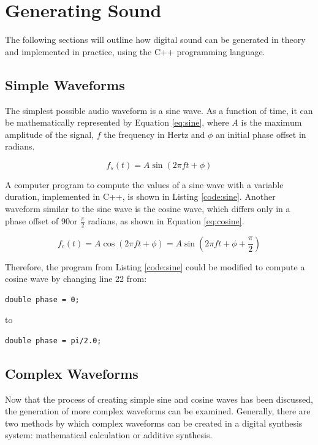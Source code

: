 \chapter{Generating Sound}

The following sections will outline how digital sound can be generated in theory and implemented in practice, using the C++ programming language.

\section{Simple Waveforms}

The simplest possible audio waveform is a sine wave. As a function of time, it can be mathematically represented by Equation \ref{eq:sine}, where $A$ is the maximum amplitude of the signal, $f$ the frequency in Hertz and $\phi$ an initial phase offset in radians.

\begin{equation}
f_{s}(t) = A \sin(2 \pi  f t + \phi)
\label{eq:sine}
\end{equation}

\noindent A computer program to compute the values of a sine wave with a variable duration, implemented in C++, is shown in Listing \ref{code:sine}. Another waveform similar to the sine wave is the cosine wave, which differs only in a phase offset of 90\degree or $\frac{\pi}{2}$ radians, as shown in Equation \ref{eq:cosine}.

\begin{equation}
f_{c}(t) = A \cos(2 \pi  f t + \phi) = A \sin(2 \pi f t + \phi + \frac{\pi}{2})
\label{eq:cosine}
\end{equation}

\noindent Therefore, the program from Listing \ref{code:sine} could be modified to compute a cosine wave by changing line 22 from:

\begin{lstlisting}[firstnumber=22]
double phase = 0;
\end{lstlisting}
to
\begin{lstlisting}[firstnumber=22]
double phase = pi/2.0;
\end{lstlisting}

\section{Complex Waveforms}

Now that the process of creating simple sine and cosine waves has been discussed, the generation of more complex waveforms can be examined. Generally, there are two methods by which complex waveforms can be created in a digital synthesis system: mathematical calculation or additive synthesis.

